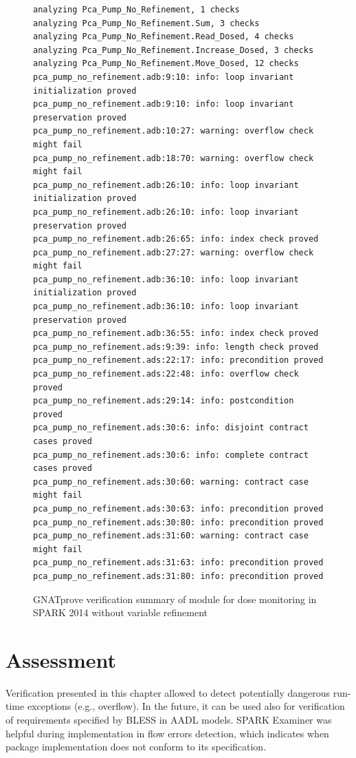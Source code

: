 \begin{figure}
\singlespacing
\begin{lstlisting}[frame=single, gobble=0]
analyzing Pca_Pump_No_Refinement, 1 checks
analyzing Pca_Pump_No_Refinement.Sum, 3 checks
analyzing Pca_Pump_No_Refinement.Read_Dosed, 4 checks
analyzing Pca_Pump_No_Refinement.Increase_Dosed, 3 checks
analyzing Pca_Pump_No_Refinement.Move_Dosed, 12 checks
pca_pump_no_refinement.adb:9:10: info: loop invariant initialization proved
pca_pump_no_refinement.adb:9:10: info: loop invariant preservation proved
pca_pump_no_refinement.adb:10:27: warning: overflow check might fail
pca_pump_no_refinement.adb:18:70: warning: overflow check might fail
pca_pump_no_refinement.adb:26:10: info: loop invariant initialization proved
pca_pump_no_refinement.adb:26:10: info: loop invariant preservation proved
pca_pump_no_refinement.adb:26:65: info: index check proved
pca_pump_no_refinement.adb:27:27: warning: overflow check might fail
pca_pump_no_refinement.adb:36:10: info: loop invariant initialization proved
pca_pump_no_refinement.adb:36:10: info: loop invariant preservation proved
pca_pump_no_refinement.adb:36:55: info: index check proved
pca_pump_no_refinement.ads:9:39: info: length check proved
pca_pump_no_refinement.ads:22:17: info: precondition proved
pca_pump_no_refinement.ads:22:48: info: overflow check proved
pca_pump_no_refinement.ads:29:14: info: postcondition proved
pca_pump_no_refinement.ads:30:6: info: disjoint contract cases proved
pca_pump_no_refinement.ads:30:6: info: complete contract cases proved
pca_pump_no_refinement.ads:30:60: warning: contract case might fail
pca_pump_no_refinement.ads:30:63: info: precondition proved
pca_pump_no_refinement.ads:30:80: info: precondition proved
pca_pump_no_refinement.ads:31:60: warning: contract case might fail
pca_pump_no_refinement.ads:31:63: info: precondition proved
pca_pump_no_refinement.ads:31:80: info: precondition proved
\end{lstlisting}
\doublespacing
\caption{GNATprove verification summary of module for dose monitoring in SPARK 2014 without variable refinement}
\label{listing:pca_pump_move_dosed_unit_spark2014_gnatprove_no_refinement}
\end{figure}


\section{Assessment}
\label{verification:assessment}

Verification presented in this chapter allowed to detect potentially dangerous run-time exceptions (e.g., overflow). In the future, it can be used also for verification of requirements specified by BLESS in AADL models. SPARK Examiner was helpful during implementation in flow errors detection, which indicates when package implementation does not conform to its specification.

